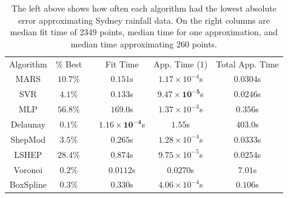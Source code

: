 \documentclass[smallextended,final]{svjour3}       %
\begin{document}
\begin{appendix}
\begin{table}
  \centering
  \begin{tabular}{|c|c| c |c|c|c|}
    \cline{1-2}\cline{4-6}
    Algorithm & \% Best &  & Fit Time & App. Time (1) & Total App. Time\\
    \cline{1-2}\cline{4-6}
    MARS & $10.7\%$ &  & $0.151$s & $1.17 \times 10^{-4}$s & $0.0304$s\\
    SVR & $4.1\%$ &  & $0.133$s & $\mathbf{9.47 \times 10^{-5}}$s & $\mathbf{0.0246}$s\\
    MLP & $\mathbf{56.8}\%$ &  & $169.0$s & $1.37 \times 10^{-3}$s & $0.356$s\\
    Delaunay & $0.1\%$ &  & $\mathbf{1.16 \times 10^{-4}}$s & $1.55$s & $403.0$s\\
    ShepMod & $3.5\%$ &  & $0.265$s & $1.28 \times 10^{-4}$s & $0.0333$s\\
    LSHEP & $\mathit{28.4}\%$ &  & $0.874$s & $\mathit{9.75 \times 10^{-5}}$s & $\mathit{0.0254}$s\\
    Voronoi & $0.2\%$ &  & $\mathit{0.0112}$s & $0.0270$s & $7.01$s\\
    BoxSpline & $0.3\%$ &  & $0.330$s & $4.06 \times 10^{-4}$s & $0.106$s\\
    \cline{1-2}\cline{4-6}
  \end{tabular}
  \caption{The left above shows how often each algorithm had the lowest absolute error approximating Sydney rainfall data. On the right columns are median fit time of 2349 points, median time for one approximation, and median time approximating 260 points.}
  \label{table:best-weather}
\end{table}



\end{appendix}
\end{document}
